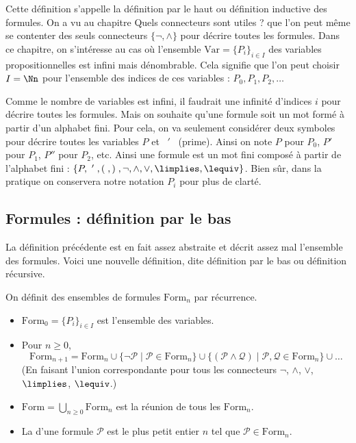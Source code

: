 \documentclass[11pt,class=report,crop=false]{standalone}
\begin{document}
Cette définition s'appelle la \og{}définition par le haut\fg{} ou \og{}définition inductive\fg{} des formules.
On a vu au chapitre \og{}Quels connecteurs sont utiles ?\fg{} que l'on peut même se contenter des seuls connecteurs $\{ \lnot, \land \}$ pour décrire toutes les formules.
Dans ce chapitre, on s'intéresse au cas où l'ensemble $\text{Var} = \{ P_i \}_{i\in I}$ des variables propositionnelles est infini mais dénombrable. Cela signifie que l'on peut choisir $I = \Nn$ pour l'ensemble des indices de ces variables : $P_0, P_1, P_2,\ldots$

\begin{remarque*}
	Comme le nombre de variables est infini, il faudrait une infinité d'indices $i$ pour décrire toutes les formules. Mais on souhaite qu'une formule soit un mot formé à partir d'un alphabet fini. Pour cela, on va seulement considérer deux symboles pour décrire toutes les variables $P$ et \ $'$ \  (prime). Ainsi on note $P$ pour $P_0$, $P'$ pour $P_1$, $P''$ pour $P_2$, etc. Ainsi une formule est un mot fini composé à partir de l'alphabet fini :
	$\{ P,\ '\; , (\;, )\;, \lnot, \land, \lor, \limplies, \lequiv \}$. Bien sûr, dans la pratique on conservera notre notation $P_i$ pour plus de clarté. 
\end{remarque*}

\subsection{Formules : définition par le bas}

La définition précédente est en fait assez abstraite et décrit assez mal l'ensemble des formules. Voici une nouvelle définition, dite \og{}définition par le bas\fg{} ou \og{}définition récursive\fg{}. 

\begin{definition}
	On définit des ensembles de formules $\text{Form}_n$ par récurrence.
	\begin{itemize}
		\item $\text{Form}_0 = \{ P_i \}_{i\in I}$ est l'ensemble des variables.
		
		\item Pour $n\ge 0$,
		\[
		\text{Form}_{n+1} = \text{Form}_{n} 
		\cup \{ \lnot \mathcal{P} \mid \mathcal{P} \in \text{Form}_n \}
		\cup \{ (\mathcal{P} \land \mathcal{Q})  \mid \mathcal{P}, \mathcal{Q} \in \text{Form}_n \}
		\cup \ldots 
		\]
		(En faisant l'union correspondante pour tous les connecteurs $\lnot$, $\land$, $\lor$, $\limplies$, $\lequiv$.)
		
		\item $\text{Form} = \bigcup_{n\ge0} \text{Form}_n$ est la réunion de tous les $\text{Form}_n$.
		
		\item La  d'une formule $\mathcal{P}$ est le plus petit entier $n$ tel que $\mathcal{P} \in \text{Form}_n$.
	\end{itemize}	
\end{definition}
\end{document}
